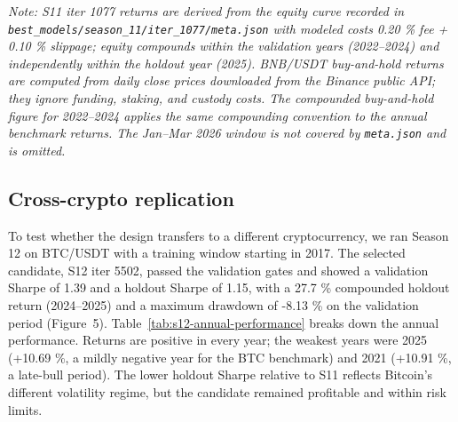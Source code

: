 \documentclass[analytics,article,submit,pdftex,moreauthors]{Definitions/mdpi}
\begin{document}
\emph{Note: S11 iter 1077 returns are derived from the equity curve recorded in \texttt{best\_models/season\_11/iter\_1077/meta.json} with modeled costs 0.20 \% fee + 0.10 \% slippage; equity compounds within the validation years (2022--2024) and independently within the holdout year (2025). BNB/USDT buy-and-hold returns are computed from daily close prices downloaded from the Binance public API; they ignore funding, staking, and custody costs. The compounded buy-and-hold figure for 2022--2024 applies the same compounding convention to the annual benchmark returns. The Jan--Mar 2026 window is not covered by \texttt{meta.json} and is omitted.}

\subsection{Cross-crypto replication}\label{cross-crypto-replication}

To test whether the design transfers to a different cryptocurrency, we ran Season 12 on BTC/USDT with a training window starting in 2017. The selected candidate, S12 iter 5502, passed the validation gates and showed a validation Sharpe of 1.39 and a holdout Sharpe of 1.15, with a 27.7 \% compounded holdout return (2024--2025) and a maximum drawdown of -8.13 \% on the validation period (Figure~5). Table~\ref{tab:s12-annual-performance} breaks down the annual performance. Returns are positive in every year; the weakest years were 2025 (+10.69 \%, a mildly negative year for the BTC benchmark) and 2021 (+10.91 \%, a late-bull period). The lower holdout Sharpe relative to S11 reflects Bitcoin's different volatility regime, but the candidate remained profitable and within risk limits.
\end{document}

